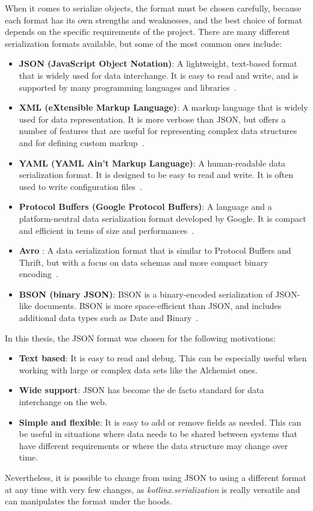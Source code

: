 When it comes to serialize objects, the format must be chosen carefully, because each format has its own strengths and weaknesses, and the best choice of format depends on the specific requirements of the project. There are many different serialization formats available, but some of the most common ones include:
\begin{itemize}
	\item \textbf{JSON (JavaScript Object Notation)}: A lightweight, text-based format that is widely used for data interchange. It is easy to read and write, and is supported by many programming languages and libraries~\cite{JSON74:online}.
	\item \textbf{XML (eXtensible Markup Language)}: A markup language that is widely used for data representation. It is more verbose than JSON, but offers a number of features that are useful for representing complex data structures and for defining custom markup~\cite{Extensib95:online}.
	\item \textbf{YAML (YAML Ain't Markup Language)}: A human-readable data serialization format. It is designed to be easy to read and write. It is often used to write configuration files~\cite{WhatisYA36:online}.
	\item \textbf{Protocol Buffers (Google Protocol Buffers)}: A language and a platform-neutral data serialization format developed by Google. It is compact and efficient in tems of size and performances~\cite{Protocol60:online}.
	\item \textbf{Avro} : A data serialization format that is similar to Protocol Buffers and Thrift, but with a focus on data schemas and more compact binary encoding~\cite{WhatisAv78:online}.
	\item \textbf{BSON (binary JSON)}: BSON is a binary-encoded serialization of JSON-like documents. BSON is more space-efficient than JSON, and includes additional data types such as Date and Binary~\cite{Explaini59:online}.
\end{itemize}

In this thesis, the JSON format was chosen for the following motivations:
\begin{itemize}
	\item \textbf{Text based}: It is easy to read and debug. This can be especially useful when working with large or complex data sets like the Alchemist ones.
	\item \textbf{Wide support}: JSON has become the de facto standard for data interchange on the web.
	\item \textbf{Simple and flexible}: It is easy to add or remove fields as needed. This can be useful in situations where data needs to be shared between systems that have different requirements or where the data structure may change over time.
\end{itemize}
Nevertheless, it is possible to change from using JSON to using a different format at any time with very few changes, as \textit{kotlinx.serialization} is really versatile and can manipulates the format under the hoods.

